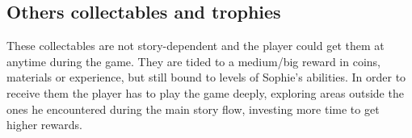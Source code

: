 
  
  
  


\subsection{Others collectables and trophies}
These collectables are not story-dependent and the player could get them at anytime during the game. They are tided to a medium/big reward in coins, materials or experience, but still bound to levels of Sophie's abilities. In order to receive them the player has to play the game deeply, exploring areas outside the ones he encountered during the main story flow, investing more time to get higher rewards.
  
  
  


